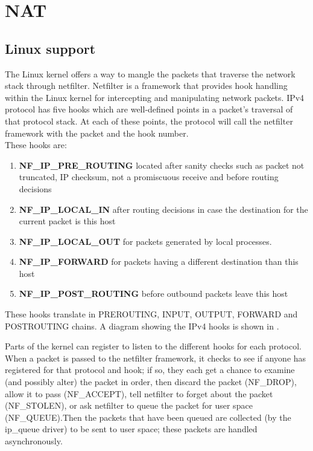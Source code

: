 {{\section{NAT}
\label{sub-sec:nat-impl}

\subsection{Linux support}
\label{sub-sec:nat-linux}
The Linux kernel offers a way to mangle the packets that traverse the network stack through netfilter. 
Netfilter is a framework that provides hook handling within the Linux kernel for intercepting and 
manipulating network packets. IPv4 protocol has five hooks which are well-defined points in a packet's 
traversal of that protocol stack. At each of these points, the protocol will call the netfilter framework 
with the packet and the hook number.
\\

These hooks are:
\begin{enumerate}
\item \textbf{NF_IP_PRE_ROUTING} located after sanity checks such as packet not truncated, IP checksum, 
not a promiscuous receive and before routing decisions 
\item \textbf{NF_IP_LOCAL_IN} after routing decisions in case the destination for the current packet 
is this host
\item \textbf{NF_IP_LOCAL_OUT} for packets generated by local processes. 
\item \textbf{NF_IP_FORWARD} for packets having a different destination than this host
\item \textbf{NF_IP_POST_ROUTING} before outbound packets leave this host 
\end{enumerate}
These hooks translate in PREROUTING, INPUT, OUTPUT, FORWARD and POSTROUTING chains.
A diagram showing the IPv4 hooks is shown in .

Parts of the kernel can register to listen to the different hooks for each protocol. When a packet is 
passed to the netfilter framework, it checks to see if anyone has registered for that protocol and hook; 
if so, they each get a chance to examine (and possibly alter) the packet in order, then discard the packet 
(NF_DROP), allow it to pass (NF_ACCEPT), tell netfilter to forget about the packet (NF_STOLEN), or ask 
netfilter to queue the packet for user space (NF_QUEUE).Then the packets that have been queued are collected 
(by the ip_queue driver) to be sent to user space; these packets are handled asynchronously.

}}
